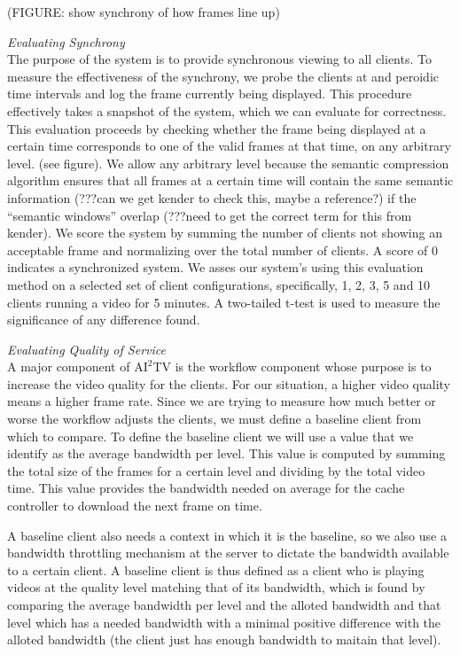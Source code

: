 \documentclass{sig-alternate}
\begin{document}
(FIGURE: show synchrony of how frames line up)

\textit{Evaluating Synchrony} \\ The purpose of the system is to
provide synchronous viewing to all clients.  To measure the
effectiveness of the synchrony, we probe the clients at and peroidic
time intervals and log the frame currently being displayed.  This
procedure effectively takes a snapshot of the system, which we can
evaluate for correctness.  This evaluation proceeds by checking
whether the frame being displayed at a certain time corresponds to one
of the valid frames at that time, on any arbitrary level.  (see
figure).  We allow any arbitrary level because the semantic
compression algorithm ensures that all frames at a certain time will
contain the same semantic information (???can we get kender to check
this, maybe a reference?) if the ``semantic windows'' overlap (???need
to get the correct term for this from kender).  We score the system by
summing the number of clients not showing an acceptable frame and
normalizing over the total number of clients.  A score of 0 indicates
a synchronized system.  We asses our system's using this evaluation
method on a selected set of client configurations, specifically, 1, 2,
3, 5 and 10 clients running a video for 5 minutes.  A two-tailed
t-test is used to measure the significance of any difference found.

\textit{Evaluating Quality of Service} \\
A major component of $\mathrm{AI}^2$TV is the workflow component whose
purpose is to increase the video quality for the clients.  For our
situation, a higher video quality means a higher frame rate.  Since we
are trying to measure how much better or worse the workflow adjusts
the clients, we must define a baseline client from which to compare.
To define the baseline client we will use a value that we identify as
the average bandwidth per level.  This value is computed by summing
the total size of the frames for a certain level and dividing by the
total video time.  This value provides the bandwidth needed on average
for the cache controller to download the next frame on time.

A baseline client also needs a context in which it is the baseline, so
we also use a bandwidth throttling mechanism \cite{shaperd} at the
server to dictate the bandwidth available to a certain client.  A
baseline client is thus defined as a client who is playing videos at
the quality level matching that of its bandwidth, which is found by
comparing the average bandwidth per level and the alloted bandwidth
and that level which has a needed bandwidth with a minimal positive
difference with the alloted bandwidth (the client just has enough
bandwidth to maitain that level).
\end{document}
